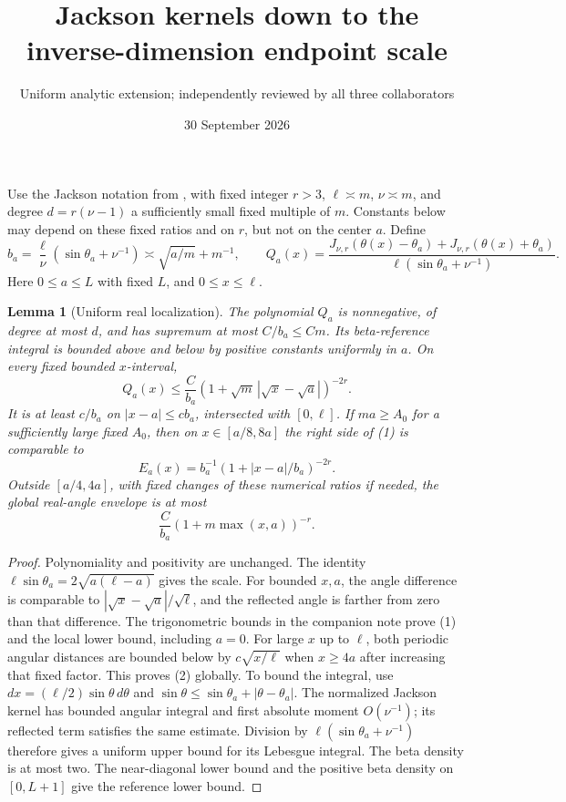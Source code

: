 \documentclass[11pt]{article}
\title{Jackson kernels down to the inverse-dimension endpoint scale}
\author{Uniform analytic extension; independently reviewed by all three collaborators}
\date{30 September 2026}
\newtheorem{lemma}{Lemma}\newtheorem{theorem}{Theorem}
\begin{document}
\maketitle
Use the Jackson notation from
, with fixed integer $r>3$,
$\ell\asymp m$, $\nu\asymp m$, and degree $d=r(\nu-1)$ a sufficiently
small fixed multiple of $m$. Constants below may depend on these
fixed ratios and on $r$, but not on the center $a$.
Define
\[
 b_a=\frac{\ell}{\nu}(\sin\theta_a+\nu^{-1})
       \asymp\sqrt{a/m}+m^{-1},\qquad
 Q_a(x)=\frac{J_{\nu,r}(\theta(x)-\theta_a)
                  +J_{\nu,r}(\theta(x)+\theta_a)}
                 {\ell(\sin\theta_a+\nu^{-1})}.
\]
Here $0\le a\le L$ with fixed $L$, and $0\le x\le\ell$.

\begin{lemma}[Uniform real localization]\label{real}
The polynomial $Q_a$ is nonnegative, of degree at most $d$, and has
supremum at most $C/b_a\le Cm$. Its beta-reference integral is
bounded above and below by positive constants uniformly in $a$.
On every fixed bounded $x$-interval,
\[
 Q_a(x)\le\frac C{b_a}
       (1+\sqrt m\,|\sqrt x-\sqrt a|)^{-2r}.             \tag{1}
\]
It is at least $c/b_a$ on $|x-a|\le cb_a$, intersected with $[0,\ell]$.
If $ma\ge A_0$ for a sufficiently large fixed $A_0$, then on
$x\in[a/8,8a]$ the right side of (1) is comparable to
\[
 E_a(x)=b_a^{-1}(1+|x-a|/b_a)^{-2r}.
\]
Outside $[a/4,4a]$, with fixed changes of these numerical ratios if
needed, the global real-angle envelope is at most
\[
 \frac C{b_a}(1+m\max(x,a))^{-r}.                       \tag{2}
\]
\end{lemma}
\begin{proof}
Polynomiality and positivity are unchanged. The identity
$\ell\sin\theta_a=2\sqrt{a(\ell-a)}$ gives the scale.
For bounded $x,a$, the angle difference is comparable to
$|\sqrt x-\sqrt a|/\sqrt\ell$, and the reflected angle is farther
from zero than that difference. The trigonometric bounds in the
companion note prove (1) and the local lower bound, including $a=0$.
For large $x$ up to $\ell$, both periodic angular distances are
bounded below by $c\sqrt{x/\ell}$ when $x\ge4a$ after increasing
that fixed factor. This proves (2) globally.
To bound the integral, use $dx=(\ell/2)\sin\theta\,d\theta$ and
$\sin\theta\le\sin\theta_a+|\theta-\theta_a|$.
The normalized Jackson kernel has bounded angular integral and
first absolute moment $O(\nu^{-1})$; its reflected term satisfies
the same estimate. Division by
$\ell(\sin\theta_a+\nu^{-1})$ therefore gives a uniform upper bound
for its Lebesgue integral. The beta density is at most two. The
near-diagonal lower bound and the positive beta density on $[0,L+1]$
give the reference lower bound.
\end{proof}
\end{document}
